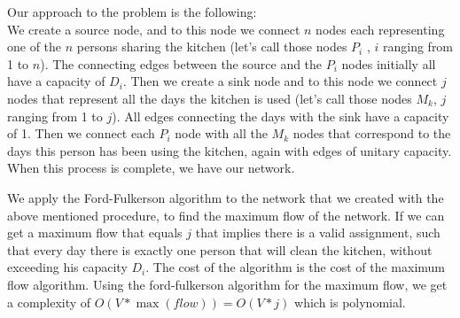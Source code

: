 Our approach to the problem is the following: \\ 
We create a source node, and to this node we connect $n$ nodes each representing one of the $n$ persons sharing the kitchen (let's call those nodes $P_i$ , $i$ ranging from 1 to $n$). The connecting edges between the source and the $P_i$ nodes initially all have a capacity of $D_i$. Then we create a sink node and to this node we connect $j$ nodes that represent all the days the kitchen is used (let's call those nodes $M_k$, $j$ ranging from 1 to $j$). All edges connecting the days with the sink have a capacity of 1. Then we connect each $P_i$ node with all the $M_k$ nodes that correspond to the days this person has been using the kitchen, again with edges of unitary capacity. When this process is complete, we have our network. 

We apply the Ford-Fulkerson algorithm to the network that we created with the above mentioned procedure, to find the maximum flow of the network. If we can get a maximum flow that equals $j$ that implies there is a valid assignment, such that every day there is exactly one person that will clean the kitchen, without exceeding his capacity $D_i$. The cost of the algorithm is the cost of the maximum flow algorithm. Using the ford-fulkerson algorithm for the maximum flow, we get a complexity of $O(V * \max (flow)) = O(V * j)$ which is polynomial.
